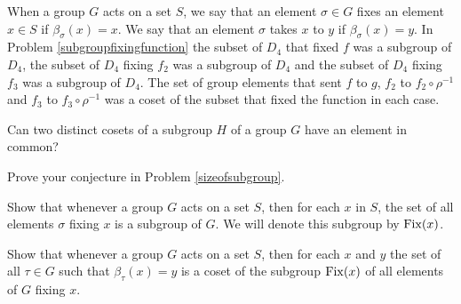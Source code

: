 When a group $G$ acts on a set $S$, we say that an element $\sigma \in
G$ fixes an element $x\in S$ if $\beta_{\sigma}(x) = x$.  We say that an
element $\sigma$ takes $x$ to $y$ if $\beta_{\sigma}(x) =y$.   In Problem
\ref{subgroupfixingfunction} the subset of
$D_4$ that fixed
$f$ was a subgroup of $D_4$, the subset of $D_4$ fixing $f_2$ was a
subgroup of $D_4$ and the subset of $D_4$ fixing $f_3$ was a subgroup of
$D_4$.  The set of group elements that sent $f$ to $g$, $f_2$ to
$f_2\circ\rho^{-1}$ and $f_3$ to $f_3\circ\rho^{-1}$ was a coset of the
subset that fixed the function in each case.

\bp
\iteme Can two distinct cosets of a subgroup $H$ of a group $G$ have an
element in common?\label{cosetspartitionG}

\iteme Prove your conjecture in Problem \ref{sizeofsubgroup}.

\iteme Show that whenever a group $G$ acts on a set $S$, then for each $x$
in $S$, the set of all elements $\sigma$ fixing $x$ is a subgroup of $G$.    We will
denote this subgroup by ${\rm Fix}(x)$.

\iteme Show that whenever a group $G$ acts on a set $S$, then for each $x$
and $y$ the set of all $\tau \in G$ such that $\beta_{\tau}(x) = y$
is a coset of the subgroup ${\rm Fix}(x)$ of all elements of $G$ fixing $x$.


